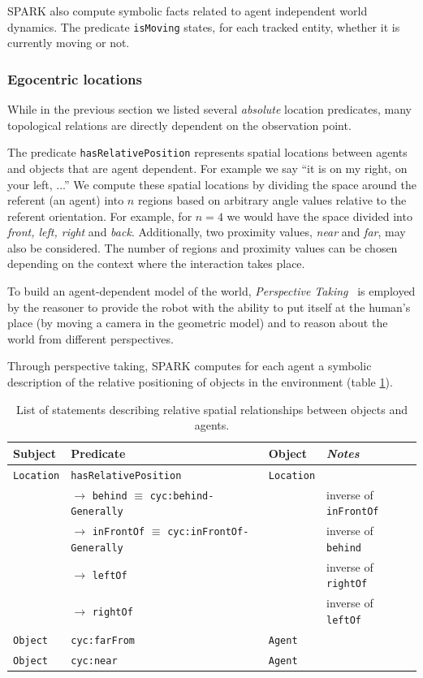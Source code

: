 \documentclass{svmult}
\newcommand{\concept}[1]{{\footnotesize \texttt{#1}}}
\begin{document}
SPARK also compute symbolic facts related to agent independent world dynamics.
The predicate \concept{isMoving} states, for each tracked entity, whether it is
currently moving or not.


\subsubsection{Egocentric locations}

While in the previous section we listed several \emph{absolute} location
predicates, many topological relations are directly dependent on the
observation point.

The predicate \concept{hasRelativePosition} represents spatial locations
between agents and objects that are agent dependent.  For example we say ``it
is on my right, on your left, ...'' We compute these spatial locations by
dividing the space around the referent (an agent) into $n$ regions based on
arbitrary angle values relative to the referent orientation.  For example, for
$n = 4$ we would have the space divided into \emph{front, left, right} and
\emph{back}. Additionally, two proximity values, \emph{near} and \emph{far},
may also be considered. The number of regions and proximity values can be
chosen depending on the context where the interaction takes place.


To build an agent-dependent model of the world, \emph{Perspective
Taking}~\cite{Flavell1992,Tversky1999} is employed by the reasoner to provide
the robot with the ability to put itself at the human's place (by moving a
camera in the geometric model) and to reason about the world from different
perspectives.


Through perspective taking, SPARK computes for each agent a symbolic
description of the relative positioning of objects in the environment (table
\ref{facts|relative}).

\begin{table}[h]
	\centering
	    \begin{tabular}{p{1.5cm}p{6cm}p{1.5cm}l}
		\rowcolor{white}
		\textbf{Subject} & \textbf{Predicate} & \textbf{Object} & \emph{Notes} \\
		\hline
	 \concept{Location}  & \concept{hasRelativePosition}  & \concept{Location} & \\ 
	 & 	$\rightarrow$ \concept{behind} $\equiv$ \concept{cyc:behind-Generally}  &  & inverse of \concept{inFrontOf}  \\ 
	 &  $\rightarrow$ \concept{inFrontOf} $\equiv$ \concept{cyc:inFrontOf-Generally}  & 	 & 	 inverse of \concept{behind}  \\ 
	 &  $\rightarrow$ \concept{leftOf}  &  &  inverse of \concept{rightOf} \\ 
	 &  $\rightarrow$ \concept{rightOf}  & 	 & 	 inverse of \concept{leftOf}  \\ 
	 \concept{Object}  & \concept{cyc:farFrom}  &  \concept{Agent} & \\ 
	 \concept{Object}  & \concept{cyc:near}  &  \concept{Agent} & 
	\end{tabular}
	\caption{List of statements describing relative spatial relationships between objects and agents.}
	\label{facts|relative}
\end{table}
\end{document}
